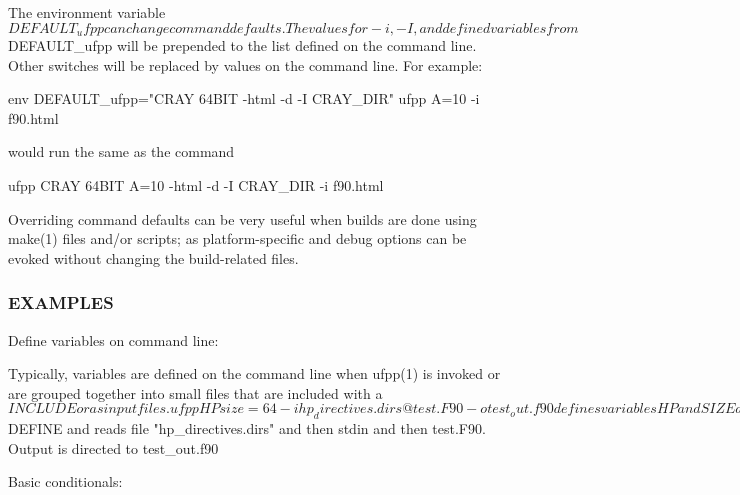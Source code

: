 \begin{DoxyVerb}The environment variable $DEFAULT_ufpp can change command defaults.
The values for -i, -I, and defined variables from $DEFAULT_ufpp will be
prepended to the list defined on the command line. Other switches will be
replaced by values on the command line. For example:

   env DEFAULT_ufpp="CRAY 64BIT -html -d -I CRAY_DIR" ufpp A=10 -i f90.html

would run the same as the command

   ufpp CRAY 64BIT A=10 -html -d -I CRAY_DIR -i f90.html

Overriding command defaults can be very useful when builds are done using
make(1) files and/or scripts; as platform-specific and debug options can
be evoked without changing the build-related files.
\end{DoxyVerb}


\subsubsection*{E\+X\+A\+M\+P\+L\+ES}

\begin{DoxyVerb}Define variables on command line:

Typically, variables are defined on the command line when ufpp(1) is invoked
or are grouped together into small files that are included with a $INCLUDE
or as input files.

  ufpp HP size=64 -i hp_directives.dirs @ test.F90 -o test_out.f90

defines variables HP and SIZE as if the expressions had been on a $DEFINE
and reads file "hp_directives.dirs" and then stdin and then test.F90.
Output is directed to test_out.f90
\end{DoxyVerb}


Basic conditionals\+:


